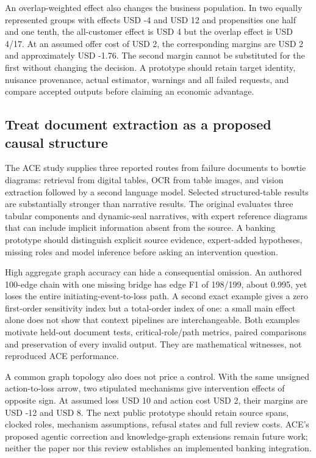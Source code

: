 An overlap-weighted effect also changes the business population. In two
equally represented groups with effects USD -4 and USD 12 and
propensities one half and one tenth, the all-customer effect is USD 4
but the overlap effect is USD 4/17. At an assumed offer cost of USD 2,
the corresponding margins are USD 2 and approximately USD -1.76. The
second margin cannot be substituted for the first without changing the
decision. A prototype should retain target identity, nuisance
provenance, actual estimator, warnings and all failed requests, and
compare accepted outputs before claiming an economic advantage.
\citep{exec21_grf_reuse,exec21_grf_reference}

\hypertarget{treat-document-extraction-as-a-proposed-causal-structure}{%
\subsection{Treat document extraction as a proposed causal
structure}\label{treat-document-extraction-as-a-proposed-causal-structure}}

The ACE study supplies three reported routes from failure documents to
bowtie diagrams: retrieval from digital tables, OCR from table images,
and vision extraction followed by a second language model. Selected
structured-table results are substantially stronger than narrative
results. The original evaluates three tabular components and
dynamic-seal narratives, with expert reference diagrams that can include
implicit information absent from the source. A banking prototype should
distinguish explicit source evidence, expert-added hypotheses, missing
roles and model inference before asking an intervention question.
\citep{exec21_ace}

High aggregate graph accuracy can hide a consequential omission. An
authored 100-edge chain with one missing bridge has edge F1 of 198/199,
about 0.995, yet loses the entire initiating-event-to-loss path. A
second exact example gives a zero first-order sensitivity index but a
total-order index of one: a small main effect alone does not show that
context pipelines are interchangeable. Both examples motivate held-out
document tests, critical-role/path metrics, paired comparisons and
preservation of every invalid output. They are mathematical witnesses,
not reproduced ACE performance. \citep{exec21_ace_reference}

A common graph topology also does not price a control. With the same
unsigned action-to-loss arrow, two stipulated mechanisms give
intervention effects of opposite sign. At assumed loss USD 10 and action
cost USD 2, their margins are USD -12 and USD 8. The next public
prototype should retain source spans, clocked roles, mechanism
assumptions, refusal states and full review costs. ACE's proposed
agentic correction and knowledge-graph extensions remain future work;
neither the paper nor this review establishes an implemented banking
integration. \citep{exec21_ace,exec21_ace_reference}

